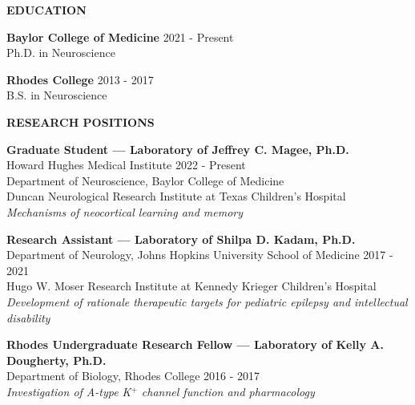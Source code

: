 \documentclass{resume} %
\begin{document}
\begin{rSection}{{\bfseries EDUCATION}}
 
    {\bfseries Baylor College of Medicine} \hfill { 2021 - Present }
    \\ Ph.D. in Neuroscience 
    \vspace{0.5\baselineskip}

    {\bfseries Rhodes College} \hfill { 2013 - 2017  }
    \\ B.S. in Neuroscience 
    \end{rSection}


\begin{rSection}{{\bfseries RESEARCH POSITIONS}}
    
    {\bfseries Graduate Student — Laboratory of Jeffrey C. Magee, Ph.D.}
    \\ Howard Hughes Medical Institute \hfill {2022 - Present}
    \\ Department of Neuroscience, Baylor College of Medicine
    \\ Duncan Neurological Research Institute at Texas Children’s Hospital \vspace{0.3\baselineskip}
    \\ \textit{Mechanisms of neocortical learning and memory}

    {\bfseries Research Assistant — Laboratory of Shilpa D. Kadam, Ph.D.} 
    \\ Department of Neurology, Johns Hopkins University School of Medicine \hfill {2017 - 2021}
    \\ Hugo W. Moser Research Institute at Kennedy Krieger Children’s Hospital \vspace{0.3\baselineskip}
    \\ \textit{Development of rationale therapeutic targets for pediatric epilepsy and intellectual disability}

    {\bfseries Rhodes Undergraduate Research Fellow — Laboratory of Kelly A. Dougherty, Ph.D.}  
    \\ Department of Biology, Rhodes College \hfill {2016 - 2017} \vspace{0.3\baselineskip}
    \\ \textit{ Investigation of A-type K$^+$ channel function and pharmacology}
\end{rSection}
\end{document}
